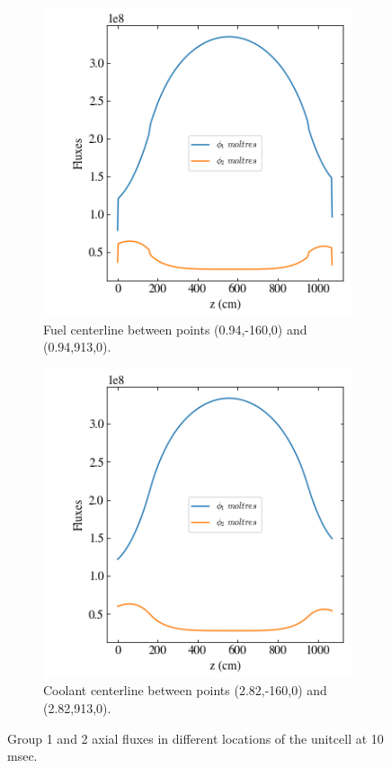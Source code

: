 \documentclass[11pt,letterpaper]{article}
\begin{document}
	\begin{figure}[htbp!]
		\centering
		\begin{subfigure}[t]{0.4\textwidth}
			\centering
			\includegraphics[width=\linewidth]{2D-unitcell-reflec-actionB1}
			\caption{Fuel centerline between points (0.94,-160,0) and (0.94,913,0).}
		\end{subfigure}
		\begin{subfigure}[t]{0.4\textwidth}
			\centering
			\includegraphics[width=\linewidth]{2D-unitcell-reflec-actionB2}
			\caption{Coolant centerline between points (2.82,-160,0) and (2.82,913,0).}
		\end{subfigure}
		\hfill
		\caption{Group 1 and 2 axial fluxes in different locations of the unitcell at 10 msec.}
		\label{fig:2D-unitcell-reflecB1}
	\end{figure}
\end{document}
